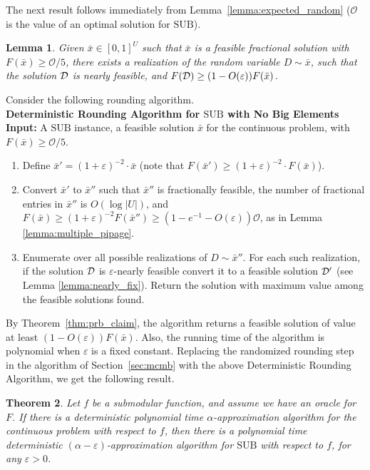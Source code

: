 \documentclass[11pt]{article}
\newtheorem{theorem}{Theorem}[section]
\newtheorem{lemma}[theorem]{Lemma}
\newcommand{\eps}{\varepsilon}
\newcommand{\bx}{\bar{x}}
\newcommand{\cD}{{\cal D}}
\newcommand{\mO}{\mathcal{O}}
\newcommand{\SUB}{\mbox{SUB}}
\begin{document}
{The next result follows immediately from
Lemma~\ref{lemma:expected_random} ($\mO$ is the value of an optimal solution for ${\SUB}$).

\begin{lemma}
\label{lemma:expected_enumeration}
Given $\bx \in [0,1]^U$ such that $\bx$ is a feasible fractional solution
with $F(\bx) \geq \mO /5$,
there exists
a realization of the random variable $D \sim \bx$, such that the solution
$\cD$ is nearly feasible, and $F(\cD) \geq (1-O(\eps) ) F(\bx)$.
\end{lemma}
}

Consider the following rounding algorithm.\\

\noindent
{\bf Deterministic Rounding Algorithm for $\SUB$ with No Big Elements} \\
\noindent
{\bf Input:} A $\SUB$ instance, a feasible solution  $\bar{x}$ for the continuous problem, with
$F(\bar{x}) \geq \mO /5$.
\begin{enumerate}
\item
Define $\bx'= (1+\eps)^{-2} \cdot \bar{x}$
(note that $F(\bx') \geq (1+\eps)^{-2} \cdot F(\bx)$).
\item Convert $\bx'$ to $\bx''$
such that $\bx''$ is fractionally feasible, the number
of fractional entries in $\bx''$ is $O(\log |U|)$, and
$F(\bx)\geq (1+\eps)^{-2} F(\bx'')\geq (1-e^{-1}-O(\eps)) \mO$,
as in Lemma \ref{lemma:multiple_pipage}.
\item Enumerate over all possible realizations of $D\sim \bx''$.
For each such realization,
if the solution $\cD$ is $\eps$-nearly feasible
convert it to a feasible solution $\cD'$ (see Lemma \ref{lemma:nearly_fix}).
Return the solution with maximum value among the feasible solutions found.
\end{enumerate}

By Theorem~\ref{thm:prb_claim}, the algorithm returns a feasible solution of value at least $(1-O(\eps)) F(\bar{x})$.
Also, the running time of the algorithm is polynomial when $\eps$ is a fixed
constant. Replacing the
randomized rounding step in the
algorithm of Section~\ref{sec:mcmb} with the above Deterministic Rounding Algorithm,
we get the following result.


\begin{theorem}
\label{thm:continuous_det_eq} Let $f$ be a submodular function,
and assume we have an oracle for $F$. If there is a deterministic
polynomial time $\alpha$-approximation algorithm for the
continuous problem with respect to $f$, then there is a polynomial
time deterministic $(\alpha-\eps)$-approximation algorithm for
$\SUB$ with respect to $f$, for any $\eps>0$.
\end{theorem}
\end{document}
